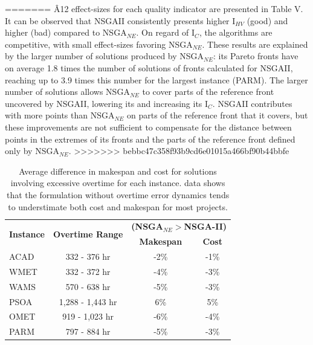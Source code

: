 \documentclass[conference]{IEEEtran}
\begin{document}
=======
\^A12 effect-sizes for each quality indicator are presented in Table V. It can be observed that NSGAII consistently presents higher I$_{HV}$ (good) and higher  (bad) compared to NSGA$_{NE}$. On regard of I$_{C}$, the algorithms are competitive, with small effect-sizes favoring NSGA$_{NE}$. These results are explained by the larger number of solutions produced by NSGA$_{NE}$: its Pareto fronts have on average 1.8 times the number of solutions of fronts calculated for NSGAII, reaching up to 3.9 times this number for the largest instance (PARM). The larger number of solutions allows NSGA$_{NE}$ to cover parts of the reference front uncovered by NSGAII, lowering its  and increasing its I$_{C}$. NSGAII contributes with more points than NSGA$_{NE}$ on parts of the reference front that it covers, but these improvements are not sufficient to compensate for the distance between points in the extremes of its fronts and the parts of the reference front defined only by NSGA$_{NE}$.
>>>>>>> bebbc47c358f93b9cd6e01015a466bf90b44bbfe
\begin{table}[htbp]
	\scriptsize
  \centering
  \caption{Average difference in makespan and cost for solutions involving excessive overtime for each instance. data shows that the formulation without overtime error dynamics tends to understimate both cost and makespan for most projects.}
    \begin{tabular}{rccc}
    \toprule
    \multicolumn{1}{c}{\multirow{2}[2]{*}{\textbf{Instance}}} & \multirow{2}[2]{*}{\textbf{Overtime  Range}} & \multicolumn{2}{c}{\textbf{(NSGA$_{NE}>$NSGA-II)}} \\

    \multicolumn{1}{c}{} &       & \textbf{Makespan } & \textbf{Cost} \\
        \midrule
    \multicolumn{1}{l}{ACAD} & 332 - 376 hr & -2\%  & -1\% \\
    \multicolumn{1}{l}{WMET} & 332 - 372 hr & -4\%  & -3\% \\
    \multicolumn{1}{l}{WAMS} & 570 - 638 hr & -5\%  & -3\% \\
    \multicolumn{1}{l}{PSOA} & 1,288 - 1,443 hr & 6\%   & 5\% \\
    \multicolumn{1}{l}{OMET} & 919 - 1,023 hr & -6\%  & -4\% \\
    \multicolumn{1}{l}{PARM} & 797 - 884 hr & -5\%  & -3\% \\
    \bottomrule
    \end{tabular}%
\end{table}%
\end{document}
